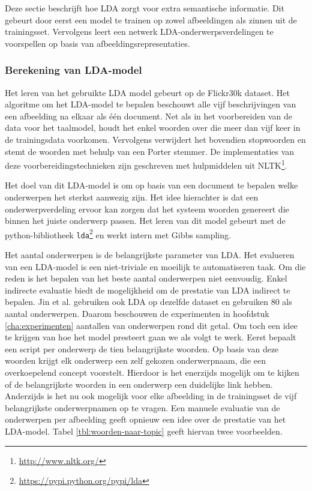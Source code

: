Deze sectie beschrijft hoe LDA zorgt voor extra semantische informatie. Dit gebeurt door eerst een model te trainen op zowel afbeeldingen als zinnen uit de trainingsset. Vervolgens leert een netwerk LDA-onderwerpsverdelingen te voorspellen op basis van afbeeldingsrepresentaties.

\subsubsection{Berekening van LDA-model}
\label{subs:Berekening van onderwerpverdeling}
Het leren van het gebruikte LDA model gebeurt op de Flickr30k dataset. Het algoritme om het LDA-model te bepalen beschouwt alle vijf beschrijvingen van een afbeelding na elkaar als \'e\'en document. Net als in het voorbereiden van de data voor het taalmodel, houdt het enkel woorden over die meer dan vijf keer in de trainingsdata voorkomen. Vervolgens verwijdert het bovendien stopwoorden en stemt de woorden met behulp van een Porter stemmer. De implementaties van deze voorbereidingstechnieken zijn geschreven met hulpmiddelen uit NLTK\footnote{\url{http://www.nltk.org/}}.

Het doel van dit LDA-model is om op basis van een document te bepalen welke onderwerpen het sterkst aanwezig zijn. Het idee hierachter is dat een onderwerpverdeling ervoor kan zorgen dat het systeem woorden genereert die binnen het juiste onderwerp passen. Het leren van dit model gebeurt met de python-bibliotheek \texttt{lda}\footnote{\url{https://pypi.python.org/pypi/lda}} en werkt intern met Gibbs sampling.

Het aantal onderwerpen is de belangrijkste parameter van LDA. Het evalueren van een LDA-model is een niet-triviale en moeilijk te automatiseren taak. Om die reden is het bepalen van het beste aantal onderwerpen niet eenvoudig. Enkel indirecte evaluatie biedt de mogelijkheid om de prestatie van LDA indirect te bepalen. Jin et al.\cite{Jin2015} gebruiken ook LDA op dezelfde dataset en gebruiken 80 als aantal onderwerpen. Daarom beschouwen de experimenten in hoofdstuk \ref{cha:experimenten} aantallen van onderwerpen rond dit getal. 
Om toch een idee te krijgen van hoe het model presteert gaan we als volgt te werk. Eerst bepaalt een script per onderwerp de tien belangrijkste woorden. Op basis van deze woorden krijgt elk onderwerp een zelf gekozen onderwerpnaam, die een overkoepelend concept voorstelt. 
Hierdoor is het enerzijds mogelijk om te kijken of de belangrijkste woorden in een onderwerp een duidelijke link hebben. Anderzijds is het nu ook mogelijk voor elke afbeelding in de trainingsset de vijf belangrijkste onderwerpnamen op te vragen. Een manuele evaluatie van de onderwerpen per afbeelding geeft opnieuw een idee over de prestatie van het LDA-model. Tabel \ref{tbl:woorden-naar-topic} geeft hiervan twee voorbeelden. 

